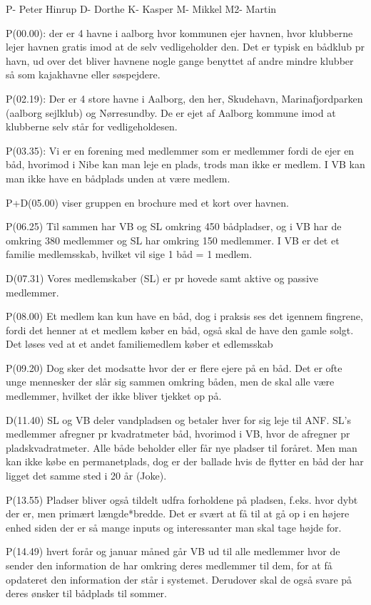 \documentclass[12pt,a4paper]{article}
\begin{document}
P- Peter Hinrup
D- Dorthe
K- Kasper
M- Mikkel
M2- Martin

P(00.00): der er 4 havne i aalborg hvor kommunen ejer havnen, hvor klubberne lejer havnen gratis imod at de selv vedligeholder den. Det er typisk en bådklub pr havn, ud over det bliver havnene nogle gange benyttet af andre mindre klubber så som kajakhavne eller søspejdere.

P(02.19): Der er 4 store havne i Aalborg, den her, Skudehavn, Marinafjordparken (aalborg sejlklub) og Nørresundby. De er ejet af Aalborg kommune imod at klubberne selv står for vedligeholdesen.

P(03.35): Vi er en forening med medlemmer som er medlemmer fordi de ejer en båd, hvorimod i Nibe kan man leje en plads, trods man ikke er medlem. I VB kan man ikke have en bådplads unden at være medlem.

P+D(05.00) viser gruppen en brochure med et kort over havnen.

P(06.25) Til sammen har VB og SL omkring 450 bådpladser, og i VB har de omkring 380 medlemmer og SL har omkring 150 medlemmer. I VB er det et familie medlemsskab, hvilket vil sige 1 båd = 1 medlem. 

D(07.31) Vores medlemskaber (SL) 	er pr hovede samt aktive og passive medlemmer.

P(08.00) Et medlem kan kun have en båd, dog i praksis ses det igennem fingrene, fordi det henner at et medlem køber en båd, også skal de have den gamle solgt. Det løses ved at et andet familiemedlem køber et edlemsskab

P(09.20) Dog sker det modsatte hvor der er flere ejere på en båd. Det er ofte unge mennesker der slår sig sammen omkring båden, men de skal alle være medlemmer, hvilket der ikke bliver tjekket op på.

D(11.40) SL og VB deler vandpladsen og betaler hver for sig leje til ANF. SL's medlemmer afregner pr kvadratmeter båd, hvorimod i VB, hvor de afregner pr pladskvadratmeter. Alle både beholder eller får nye pladser til foråret. Men man kan ikke købe en permanetplads, dog er der ballade hvis de flytter en båd der har ligget det samme sted i 20 år (Joke).

P(13.55) Pladser bliver også tildelt udfra forholdene på pladsen, f.eks. hvor dybt der er, men primært længde*bredde. Det er svært at få til at gå op i en højere enhed siden der er så mange inputs og interessanter man skal tage højde for.

P(14.49) hvert forår og januar måned går VB ud til alle medlemmer hvor de sender den information de har omkring deres medlemmer til dem, for at få opdateret den information der står i systemet. Derudover skal de også svare på deres ønsker til bådplads til sommer.	
\end{document}
